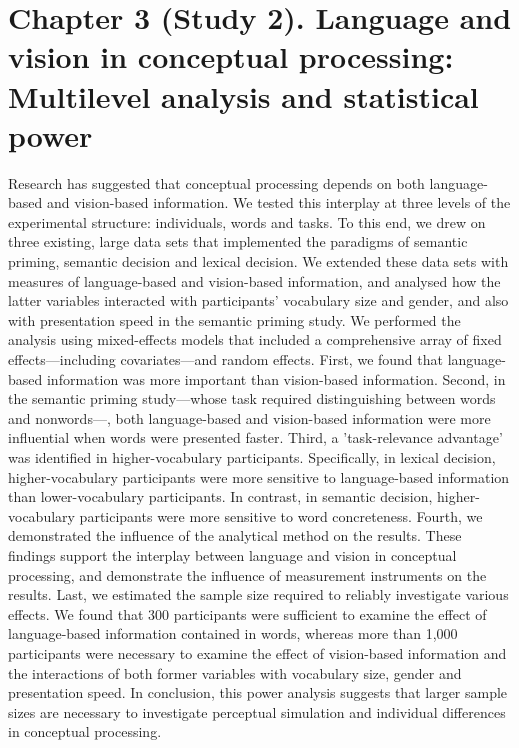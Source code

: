 \documentclass[
  12pt,
  man,floatsintext]{apa7}
\begin{document}
\clearpage

\hypertarget{chapter-3-study-2.-language-and-vision-in-conceptual-processing-multilevel-analysis-and-statistical-power}{%
\section{Chapter 3 (Study 2). Language and vision in conceptual processing: Multilevel analysis and statistical power}\label{chapter-3-study-2.-language-and-vision-in-conceptual-processing-multilevel-analysis-and-statistical-power}}

\bigskip
\bigskip
\bigskip

\begin{adjustwidth}{1.5cm}{1.5cm}

Research has suggested that conceptual processing depends on both language-based and vision-based information. We tested this interplay at three levels of the experimental structure: individuals, words and tasks. To this end, we drew on three existing, large data sets that implemented the paradigms of semantic priming, semantic decision and lexical decision. We extended these data sets with measures of language-based and vision-based information, and analysed how the latter variables interacted with participants' vocabulary size and gender, and also with presentation speed in the semantic priming study. We performed the analysis using mixed-effects models that included a comprehensive array of fixed effects---including covariates---and random effects. First, we found that language-based information was more important than vision-based information. Second, in the semantic priming study---whose task required distinguishing between words and nonwords---, both language-based and vision-based information were more influential when words were presented faster. Third, a 'task-relevance advantage' was identified in higher-vocabulary participants. Specifically, in lexical decision, higher-vocabulary participants were more sensitive to language-based information than lower-vocabulary participants. In contrast, in semantic decision, higher-vocabulary participants were more sensitive to word concreteness. Fourth, we demonstrated the influence of the analytical method on the results. These findings support the interplay between language and vision in conceptual processing, and demonstrate the influence of measurement instruments on the results. Last, we estimated the sample size required to reliably investigate various effects. We found that 300 participants were sufficient to examine the effect of language-based information contained in words, whereas more than 1,000 participants were necessary to examine the effect of vision-based information and the interactions of both former variables with vocabulary size, gender and presentation speed. In conclusion, this power analysis suggests that larger sample sizes are necessary to investigate perceptual simulation and individual differences in conceptual processing.

\end{adjustwidth}
\end{document}
